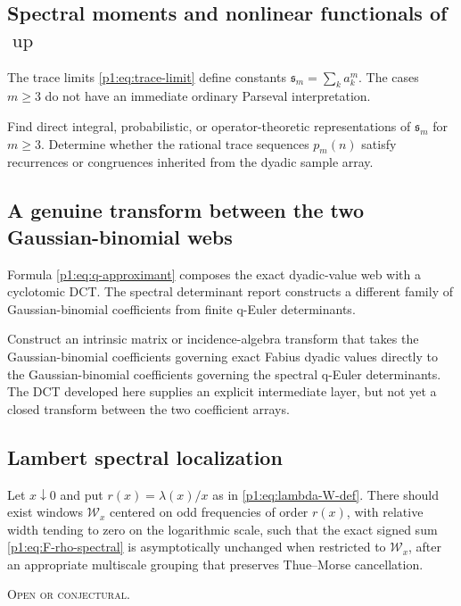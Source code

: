 \documentclass[11pt,oneside]{article}
\theoremstyle{definition}
\theoremstyle{remark}
\newcommand{\Up}{\operatorname{up}}
\newcommand{\openstatus}{\textcolor{conjectureorange}{\textsc{Open or conjectural.}}}
\begin{document}
\subsection{Spectral moments and nonlinear functionals of \texorpdfstring{$\Up$}{up}}

The trace limits \eqref{p1:eq:trace-limit} define constants
$\mathfrak s_m=\sum_ka_k^m$.  The cases $m\ge3$ do not have an immediate
ordinary Parseval interpretation.

\begin{problem}\label{p1:prob:nonlinear-traces}
Find direct integral, probabilistic, or operator-theoretic representations of
$\mathfrak s_m$ for $m\ge3$.  Determine whether the rational trace sequences
$p_m(n)$ satisfy recurrences or congruences inherited from the dyadic sample
array.
\end{problem}

\subsection{A genuine transform between the two Gaussian-binomial webs}

Formula \eqref{p1:eq:q-approximant} composes the exact dyadic-value web with a
cyclotomic DCT.  The spectral determinant report constructs a different family
of Gaussian-binomial coefficients from finite q-Euler determinants.

\begin{problem}\label{p1:prob:two-q-webs}
Construct an intrinsic matrix or incidence-algebra transform that takes the
Gaussian-binomial coefficients governing exact Fabius dyadic values directly
to the Gaussian-binomial coefficients governing the spectral q-Euler
determinants.  The DCT developed here supplies an explicit intermediate layer,
but not yet a closed transform between the two coefficient arrays.
\end{problem}

\subsection{Lambert spectral localization}

\begin{conjecture}\label{p1:conj:Lambert-localization}
Let $x\downarrow0$ and put $r(x)=\lambda(x)/x$ as in
\eqref{p1:eq:lambda-W-def}.  There should exist windows
$\mathcal W_x$ centered on odd frequencies of order $r(x)$, with relative width
tending to zero on the logarithmic scale, such that the exact signed sum
\eqref{p1:eq:F-rho-spectral} is asymptotically unchanged when restricted to
$\mathcal W_x$, after an appropriate multiscale grouping that preserves
Thue--Morse cancellation.

\smallskip\noindent\openstatus
\end{conjecture}
\end{document}
